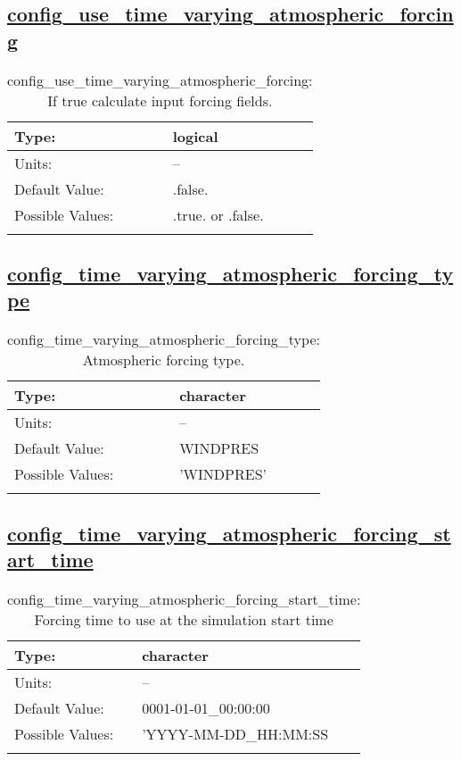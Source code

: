 \subsection[config\_use\_time\_varying\_atmospheric\_forcing]{\hyperref[sec:nm_tab_time_varying_forcing]{config\_use\_time\_varying\_atmospheric\_forcing}}
\label{subsec:nm_sec_config_use_time_varying_atmospheric_forcing}
\begin{center}
\begin{longtable}{| p{2.0in} || p{4.0in} |}
    \hline
    Type: & logical \\
    \hline
    Units: & -- \\
    \hline
    Default Value: & .false. \\
    \hline
    Possible Values: & .true. or .false. \\
    \hline
    \caption{config\_use\_time\_varying\_atmospheric\_forcing: If true calculate input forcing fields.}
\end{longtable}
\end{center}
\subsection[config\_time\_varying\_atmospheric\_forcing\_type]{\hyperref[sec:nm_tab_time_varying_forcing]{config\_time\_varying\_atmospheric\_forcing\_type}}
\label{subsec:nm_sec_config_time_varying_atmospheric_forcing_type}
\begin{center}
\begin{longtable}{| p{2.0in} || p{4.0in} |}
    \hline
    Type: & character \\
    \hline
    Units: & -- \\
    \hline
    Default Value: & WINDPRES \\
    \hline
    Possible Values: & 'WINDPRES' \\
    \hline
    \caption{config\_time\_varying\_atmospheric\_forcing\_type: Atmospheric forcing type.}
\end{longtable}
\end{center}
\subsection[config\_time\_varying\_atmospheric\_forcing\_start\_time]{\hyperref[sec:nm_tab_time_varying_forcing]{config\_time\_varying\_atmospheric\_forcing\_start\_time}}
\label{subsec:nm_sec_config_time_varying_atmospheric_forcing_start_time}
\begin{center}
\begin{longtable}{| p{2.0in} || p{4.0in} |}
    \hline
    Type: & character \\
    \hline
    Units: & -- \\
    \hline
    Default Value: & 0001-01-01\_00:00:00 \\
    \hline
    Possible Values: & 'YYYY-MM-DD\_HH:MM:SS \\
    \hline
    \caption{config\_time\_varying\_atmospheric\_forcing\_start\_time: Forcing time to use at the simulation start time}
\end{longtable}
\end{center}
